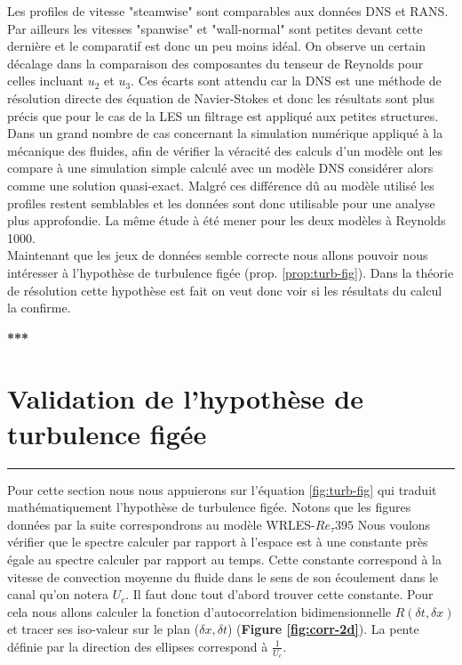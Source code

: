 \documentclass[12pt]{article}
\theoremstyle{plain}
\theoremstyle{remark}
\begin{document}
Les profiles de vitesse "steamwise" sont comparables aux données DNS et RANS. Par ailleurs les vitesses "spanwise" et "wall-normal" sont petites devant cette dernière et le comparatif est donc un peu moins idéal. On observe un certain décalage dans la comparaison des composantes du tenseur de Reynolds pour celles incluant $u_2$ et $u_3$. Ces écarts sont attendu car la DNS est une méthode de résolution directe des équation de Navier-Stokes et donc les résultats sont plus précis que pour le cas de la LES un filtrage est appliqué aux petites structures. Dans un grand nombre de cas concernant la simulation numérique appliqué à la mécanique des fluides, afin de vérifier la véracité des calculs d'un modèle ont les compare à une simulation simple calculé avec un modèle DNS considérer alors comme une solution quasi-exact. Malgré ces différence dû au modèle utilisé les profiles restent semblables et les données sont donc utilisable pour une analyse plus approfondie. La même étude à été mener pour les deux modèles à Reynolds 1000. \\


Maintenant que les jeux de données semble correcte nous allons pouvoir nous intéresser à l'hypothèse de turbulence figée (prop. \ref{prop:turb-fig}). Dans la théorie de résolution cette hypothèse est fait on veut donc voir si les résultats du calcul la confirme. 


\begin{center}
	\large {\bf{***}}
\end{center}

\vspace{0.3cm}
\section{Validation de l'hypothèse de turbulence figée}
\noindent\rule{\linewidth}{2pt}
\vspace{0.1cm}

Pour cette section nous nous appuierons sur l'équation \ref{fig:turb-fig} qui traduit mathématiquement l'hypothèse de turbulence figée. Notons que les figures données par la suite correspondrons au modèle WRLES-$Re_{\tau}395$  Nous voulons vérifier que le spectre calculer par rapport à l'espace est à une constante près égale au spectre calculer par rapport au temps. Cette constante correspond à la vitesse de convection moyenne du fluide dans le sens de son écoulement dans le canal qu'on notera $U_c$. Il faut donc tout d'abord trouver cette constante. Pour cela nous allons calculer la fonction d'autocorrelation bidimensionnelle $R(\delta t, \delta x)$ et tracer ses iso-valeur sur le plan ($\delta x, \delta t$) ({\bf Figure \ref{fig:corr-2d}}). La pente définie par la direction des ellipses correspond à $\frac{1}{U_c}$.
\end{document}
